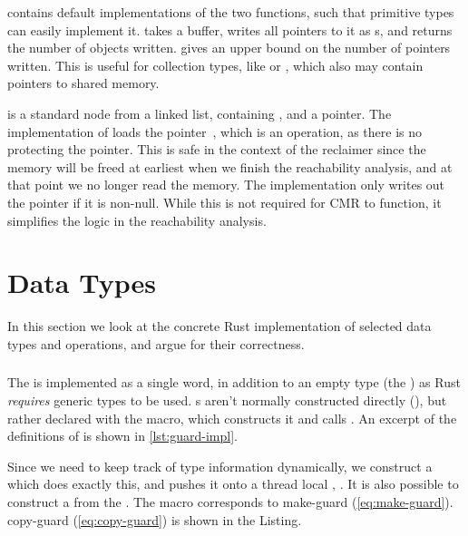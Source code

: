 \begin{figure}[ht]
  
\end{figure}

 contains default implementations of the two functions, such that primitive types can
easily implement it.  takes a buffer, writes all pointers to it as s,
and returns the number of objects written.  gives an upper bound on the number of
pointers written. This is useful for collection types, like  or , which
also may contain pointers to shared memory.

 is a standard node from a linked list, containing , and a 
pointer. The implementation of  loads the  pointer~, which is
an  operation, as there is no  protecting the pointer. This is safe in the
context of the reclaimer since the memory will be freed at earliest when we finish the reachability
analysis, and at that point we no longer read the memory. The implementation only writes out the
pointer if it is non-null. While this is not required for CMR to function, it simplifies the logic
in the reachability analysis.


\section{Data Types\label{sec:data-types}}

In this section we look at the concrete Rust implementation of selected data types and operations,
and argue for their correctness.


\subsubsection{}

The  is implemented as a single word, in addition to an empty type (the
) as Rust \emph{requires} generic types to be used. s aren't normally
constructed directly (), but rather declared with the
 macro, which constructs it and calls .
An excerpt of the definitions of  is shown in \cref{lst:guard-impl}.




Since we need to keep track of type information dynamically, we construct a 
which does exactly this, and pushes it onto a thread local , .  It is also
possible to construct a  from the .  The  macro corresponds
to make-guard (\cref{eq:make-guard}). copy-guard (\cref{eq:copy-guard}) is shown in the Listing.

